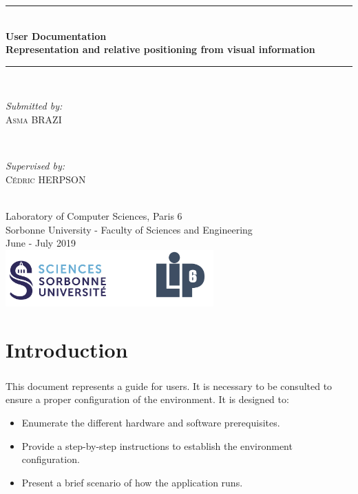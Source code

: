 \documentclass[12pt]{report}
\begin{document}
\begin{titlepage}

\newcommand{\HRule}{\rule{\linewidth}{0.5mm}} %

\center 
\HRule \\[0.4cm]
{ \huge \bfseries User Documentation \\Representation and relative positioning from visual information}\\[0.4cm]
\HRule \\[1.5cm]

\begin{minipage}{0.4\textwidth}
	\begin{flushleft} \large
		\emph{Submitted by:}\\
		\textsc{Asma BRAZI}
	\end{flushleft}
\end{minipage}
~
\begin{minipage}{0.4\textwidth}
	\begin{flushright} \large
		\emph{Supervised by:} \\
		\textsc{Cédric HERPSON}\\
	\end{flushright}
\end{minipage}\\[4cm]


{\large Laboratory of Computer Sciences, Paris 6 \\ Sorbonne University - Faculty of Sciences and Engineering}\\[3cm] 
{\large June - July 2019 }\\[3cm] 
\includegraphics[width=0.6\textwidth]{res/logo.png}\\[1cm] 
\vfill %

\end{titlepage}
\tableofcontents
\chapter{Introduction}
\paragraph{}
This document represents a guide for users. It is necessary to be consulted to ensure a proper configuration of the environment. It is designed to:
\begin{itemize}
    \item Enumerate the different hardware and software prerequisites.
    \item Provide a step-by-step instructions to establish the environment configuration.
    \item Present a brief scenario of how the application runs.
\end{itemize}
\end{document}
